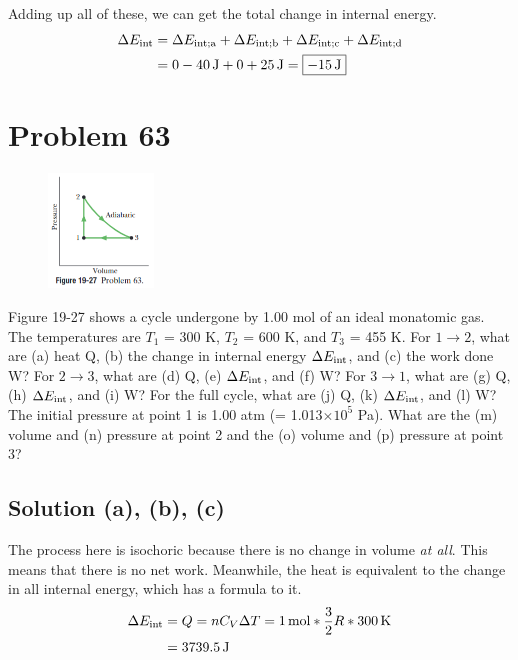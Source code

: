 \documentclass[12pt]{article}
\newcommand{\E}[1]{\times 10^{#1}}
\begin{document}
            Adding up all of these, we can get the total change in internal energy.
            \begin{align}
                \Delta E_{\rm int}  &=  \Delta E_{\rm int; a} + \Delta E_{\rm int; b} + \Delta E_{\rm int; c} + \Delta E_{\rm int; d}\\
                    &=  0 - 40\,\unit{\joule} + 0 + 25\,\unit{\joule}
                    =   \boxed{-15\,\unit{\joule}}
            \end{align}

    \pagebreak
    \section{Problem 63}
        \begin{figure}
            \vspace{-30pt}
            \includegraphics[width=0.25\textwidth]{picture_19-27.png} 
        \end{figure}
        Figure 19-27 shows a cycle undergone by 1.00 mol of an ideal monatomic gas. 
        The temperatures are $T_1$ = 300 K, $T_2$ = 600 K, and $T_3$ = 455 K. 
        For $1 \to 2$, what are (a) heat Q, (b) the change in internal energy $\Delta E_{\rm int}$, and (c) the work done W? 
        For $2 \to 3$, what are (d) Q, (e) $\Delta E_{\rm int}$, and (f) W? 
        For $3 \to 1$, what are (g) Q, (h) $\Delta E_{\rm int}$, and (i) W? 
        For the full cycle, what are (j) Q, (k) $\Delta E_{\rm int}$, and (l) W? 
        The initial pressure at point 1 is 1.00 atm (= 1.013$\E{5}$ Pa). 
        What are the (m) volume and (n) pressure at point 2 and the (o) volume and (p) pressure at point 3?

        \subsection{Solution (a), (b), (c)}
            The process here is isochoric because there is no change in volume \textit{at all}.
            This means that there is no net work.
            Meanwhile, the heat is equivalent to the change in all internal energy, which has a formula to it.
            \begin{align}
                \Delta E_{\rm int}  &=  Q
                    =   n C_V \Delta T
                    =   1\,\unit{\mole} * \frac{3}{2}R * 300\,\unit{\kelvin}\\
                    &=  3739.5\,\unit{\joule}
            \end{align}
\end{document}
